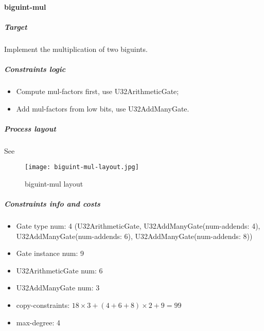 \paragraph{biguint-mul}

\subparagraph{Target}
Implement the multiplication of two biguints.

\subparagraph{Constraints logic}
\begin{itemize}
    \item Compute mul-factors first, use U32ArithmeticGate;
    \item Add mul-factors from low bits, use U32AddManyGate.
\end{itemize}

\subparagraph{Process layout}
See 
\begin{figure}[!ht]
    \centering
    \texttt{[image: biguint-mul-layout.jpg]}
    \caption{biguint-mul layout}
    \label{fig:biguint-mul-layout}
\end{figure}

\subparagraph{Constraints info and costs}
\begin{itemize}
    \item Gate type num: 4 (U32ArithmeticGate, U32AddManyGate(num-addends: 4), U32AddManyGate(num-addends: 6), U32AddManyGate(num-addends: 8))
    \item Gate instance num: 9
    \item U32ArithmeticGate num: 6
    \item U32AddManyGate num: 3
    \item copy-constraints: $18 \times 3 + (4 + 6 + 8) \times 2 + 9 = 99$
    \item max-degree: 4
\end{itemize}
